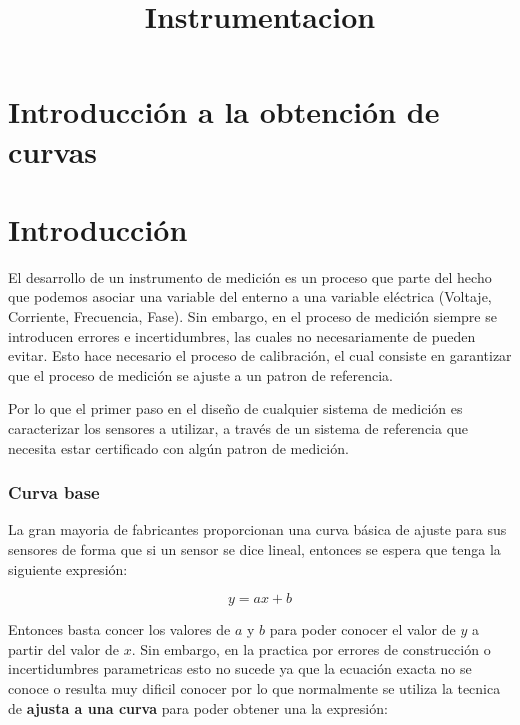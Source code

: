 \documentclass{article}
\title{Instrumentacion}
\begin{document}
    
    
    \maketitle
    
    

    

    \section{Introducción a la obtención de curvas}


    \section{Introducción}\label{introducciuxf3n}

El desarrollo de un instrumento de medición es un proceso que parte del
hecho que podemos asociar una variable del enterno a una variable
eléctrica (Voltaje, Corriente, Frecuencia, Fase). Sin embargo, en el
proceso de medición siempre se introducen errores e incertidumbres, las
cuales no necesariamente de pueden evitar. Esto hace necesario el
proceso de calibración, el cual consiste en garantizar que el proceso de
medición se ajuste a un patron de referencia.

Por lo que el primer paso en el diseño de cualquier sistema de medición
es caracterizar los sensores a utilizar, a través de un sistema de
referencia que necesita estar certificado con algún patron de medición.

\subsubsection{Curva base}\label{curva-base}

La gran mayoria de fabricantes proporcionan una curva básica de ajuste
para sus sensores de forma que si un sensor se dice lineal, entonces se
espera que tenga la siguiente expresión:

\begin{equation}
y=ax+b
\end{equation}

Entonces basta concer los valores de $a$ y $b$ para poder conocer el
valor de $y$ a partir del valor de $x$. Sin embargo, en la practica por
errores de construcción o incertidumbres parametricas esto no sucede ya
que la ecuación exacta no se conoce o resulta muy dificil conocer por lo
que normalmente se utiliza la tecnica de \textbf{ajusta a una curva}
para poder obtener una la expresión:
\end{document}
